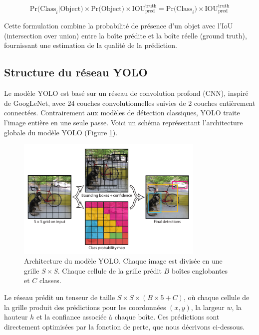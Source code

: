 \documentclass[a4paper,11pt]{article}
\begin{document}
\begin{equation}
\text{Pr(Class}_i | \text{Object}) \times \text{Pr(Object)} \times \text{IOU}_{\text{pred}}^{\text{truth}} = \text{Pr(Class}_i) \times \text{IOU}_{\text{pred}}^{\text{truth}}
\end{equation}

Cette formulation combine la probabilité de présence d'un objet avec l'IoU (intersection over union) entre la boîte prédite et la boîte réelle (ground truth), fournissant une estimation de la qualité de la prédiction.

\subsection{Structure du réseau YOLO}
Le modèle YOLO est basé sur un réseau de convolution profond (CNN), inspiré de GoogLeNet, avec 24 couches convolutionnelles suivies de 2 couches entièrement connectées. Contrairement aux modèles de détection classiques, YOLO traite l'image entière en une seule passe. Voici un schéma représentant l'architecture globale du modèle YOLO (Figure \ref{fig:yolo}).

\begin{figure}[h]
    \centering
    \includegraphics[width=0.8\textwidth]{../Images/yolo_architecture.PNG}
    \caption{Architecture du modèle YOLO. Chaque image est divisée en une grille $S \times S$. Chaque cellule de la grille prédit $B$ boîtes englobantes et $C$ classes.}
    \label{fig:yolo}
\end{figure}

Le réseau prédit un tenseur de taille $S \times S \times (B \times 5 + C)$, où chaque cellule de la grille produit des prédictions pour les coordonnées $(x, y)$, la largeur $w$, la hauteur $h$ et la confiance associée à chaque boîte. Ces prédictions sont directement optimisées par la fonction de perte, que nous décrivons ci-dessous.
\end{document}
